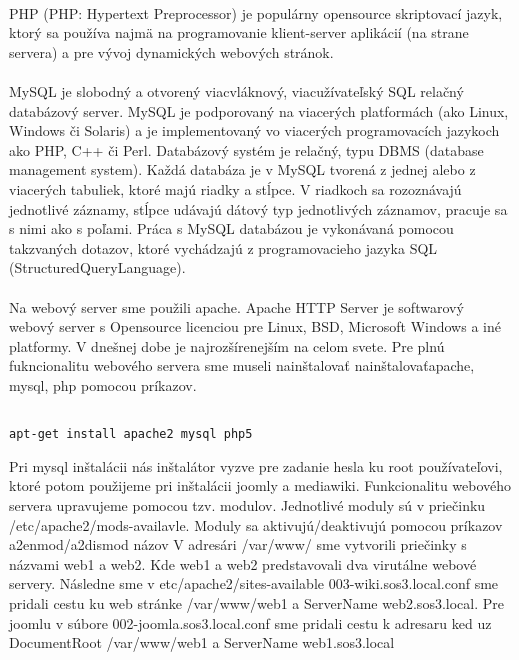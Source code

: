 \paragraph{}
PHP (PHP: Hypertext Preprocessor) je populárny opensource skriptovací jazyk, ktorý sa používa najmä na programovanie klient-server aplikácií (na strane servera) a pre vývoj dynamických webových stránok.

\paragraph{}
MySQL je slobodný a otvorený viacvláknový, viacužívateľský SQL relačný databázový server. MySQL je podporovaný na viacerých platformách (ako Linux, Windows či Solaris) a je implementovaný vo viacerých programovacích jazykoch ako PHP, C++ či Perl. Databázový systém je relačný, typu DBMS (database management system). Každá databáza je v MySQL tvorená z jednej alebo z viacerých tabuliek, ktoré majú riadky a stĺpce. V riadkoch sa rozoznávajú jednotlivé záznamy, stĺpce udávajú dátový typ jednotlivých záznamov, pracuje sa s nimi ako s poľami. Práca s MySQL databázou je vykonávaná pomocou takzvaných dotazov, ktoré vychádzajú z programovacieho jazyka SQL (StructuredQueryLanguage).

\paragraph{}
Na webový server sme použili apache. Apache HTTP Server je softwarový webový server s Opensource licenciou pre Linux, BSD, Microsoft Windows a iné platformy. V dnešnej dobe je najrozšírenejším na celom svete. Pre plnú fukncionalitu webového servera sme museli nainštalovať nainštalovaťapache, mysql, php pomocou príkazov.

\noindent
{\selectfont
\begin{small}
\begin{verbatim}

apt-get install apache2 mysql php5

\end{verbatim}
\end{small}
}

Pri mysql inštalácii nás inštalátor vyzve pre zadanie hesla ku root používateľovi, ktoré potom použijeme pri inštalácii joomly a mediawiki. Funkcionalitu webového servera upravujeme pomocou tzv. modulov. Jednotlivé moduly sú v priečinku /etc/apache2/mods-availavle. Moduly sa aktivujú/deaktivujú pomocou príkazov a2enmod/a2dismod názov 
V adresári /var/www/ sme vytvorili priečinky s názvami web1 a web2. Kde web1 a web2 predstavovali dva virutálne webové servery. Následne sme v etc/apache2/sites-available 003-wiki.sos3.local.conf sme pridali cestu ku web stránke /var/www/web1 a ServerName web2.sos3.local. Pre joomlu v súbore 002-joomla.sos3.local.conf sme pridali cestu k adresaru ked uz DocumentRoot /var/www/web1 a ServerName web1.sos3.local

